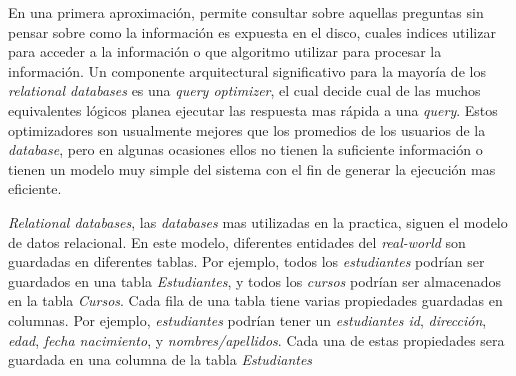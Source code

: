 En una primera aproximación,  permite consultar sobre aquellas preguntas sin pensar sobre como la información es expuesta en el disco, cuales indices utilizar para acceder a la información o que algoritmo utilizar para procesar la información. Un componente arquitectural significativo para la mayoría de los \textit{relational databases} es una \textit{query optimizer}, el cual decide cual de las muchos equivalentes lógicos planea ejecutar las respuesta mas rápida a una \textit{query}. Estos optimizadores son usualmente mejores que los promedios de los usuarios de la \textit{database}, pero en algunas ocasiones ellos no tienen la suficiente información o tienen un modelo muy simple del sistema con el fin de generar la ejecución mas eficiente.

\textit{Relational databases}, las \textit{databases} mas utilizadas en la practica, siguen el modelo de datos relacional. En este modelo, diferentes entidades del \textit{real-world} son guardadas en diferentes tablas. Por ejemplo, todos los \textit{estudiantes} podrían ser guardados en una tabla \textit{Estudiantes}, y todos los \textit{cursos} podrían ser almacenados en la tabla \textit{Cursos}. Cada fila de una tabla tiene varias propiedades guardadas en columnas. Por ejemplo, \textit{estudiantes} podrían tener un \textit{estudiantes id}, \textit{dirección}, \textit{edad},  \textit{fecha nacimiento}, y \textit{nombres/apellidos}. Cada una de estas propiedades sera guardada en una columna de la tabla \textit{Estudiantes}


